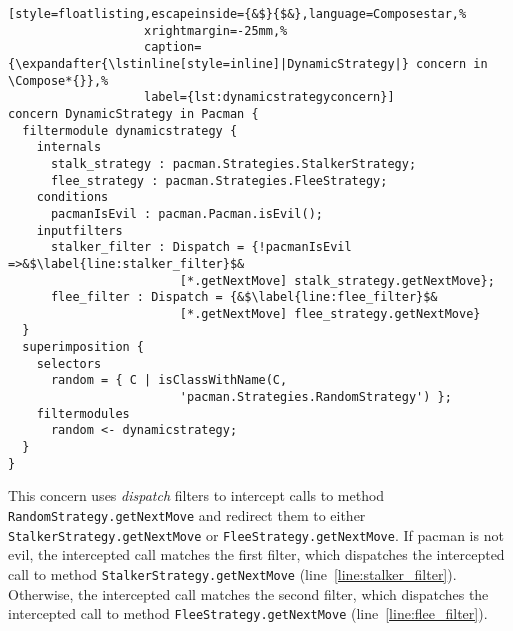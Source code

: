 \begin{lstlisting}[style=floatlisting,escapeinside={&$}{$&},language=Composestar,%
                   xrightmargin=-25mm,%
                   caption={\expandafter{\lstinline[style=inline]|DynamicStrategy|} concern in \Compose*{}},%
                   label={lst:dynamicstrategyconcern}]
concern DynamicStrategy in Pacman {
  filtermodule dynamicstrategy {
    internals
      stalk_strategy : pacman.Strategies.StalkerStrategy;
      flee_strategy : pacman.Strategies.FleeStrategy;   
    conditions
      pacmanIsEvil : pacman.Pacman.isEvil();
    inputfilters
      stalker_filter : Dispatch = {!pacmanIsEvil =>&$\label{line:stalker_filter}$&
                        [*.getNextMove] stalk_strategy.getNextMove};
      flee_filter : Dispatch = {&$\label{line:flee_filter}$&
                        [*.getNextMove] flee_strategy.getNextMove}
  }
  superimposition {
    selectors
      random = { C | isClassWithName(C,
                        'pacman.Strategies.RandomStrategy') };
    filtermodules
      random <- dynamicstrategy;
  }
}
\end{lstlisting}

This concern uses \emph{dispatch} filters to intercept calls to method \lstinline|RandomStrategy.getNextMove| and redirect them to either \lstinline|StalkerStrategy.getNextMove| or \lstinline|FleeStrategy.getNextMove|.
If pacman is not evil, the intercepted call matches the first filter, which dispatches the intercepted call to method \lstinline|StalkerStrategy.getNextMove| (line~\ref{line:stalker_filter}).
Otherwise, the intercepted call matches the second filter, which dispatches the intercepted call to method \lstinline|FleeStrategy.getNextMove| (line~\ref{line:flee_filter}).

